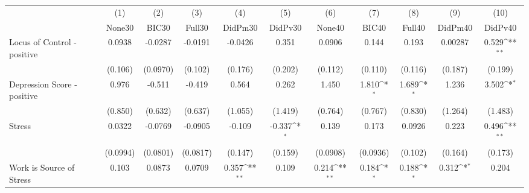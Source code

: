 {
\def\sym#1{\ifmmode^{#1}\else\(^{#1}\)\fi}
\begin{tabular}{l*{10}{c}}
\toprule
            &\multicolumn{1}{c}{(1)}&\multicolumn{1}{c}{(2)}&\multicolumn{1}{c}{(3)}&\multicolumn{1}{c}{(4)}&\multicolumn{1}{c}{(5)}&\multicolumn{1}{c}{(6)}&\multicolumn{1}{c}{(7)}&\multicolumn{1}{c}{(8)}&\multicolumn{1}{c}{(9)}&\multicolumn{1}{c}{(10)}\\
            &\multicolumn{1}{c}{None30}&\multicolumn{1}{c}{BIC30}&\multicolumn{1}{c}{Full30}&\multicolumn{1}{c}{DidPm30}&\multicolumn{1}{c}{DidPv30}&\multicolumn{1}{c}{None40}&\multicolumn{1}{c}{BIC40}&\multicolumn{1}{c}{Full40}&\multicolumn{1}{c}{DidPm40}&\multicolumn{1}{c}{DidPv40}\\
\midrule
Locus of Control - positive&      0.0938         &     -0.0287         &     -0.0191         &     -0.0426         &       0.351         &      0.0906         &       0.144         &       0.193         &     0.00287         &       0.529\sym{**} \\
            &     (0.106)         &    (0.0970)         &     (0.102)         &     (0.176)         &     (0.202)         &     (0.112)         &     (0.110)         &     (0.116)         &     (0.187)         &     (0.199)         \\
\addlinespace
Depression Score - positive&       0.976         &      -0.511         &      -0.419         &       0.564         &       0.262         &       1.450         &       1.810\sym{*}  &       1.689\sym{*}  &       1.236         &       3.502\sym{*}  \\
            &     (0.850)         &     (0.632)         &     (0.637)         &     (1.055)         &     (1.419)         &     (0.764)         &     (0.767)         &     (0.830)         &     (1.264)         &     (1.483)         \\
\addlinespace
Stress      &      0.0322         &     -0.0769         &     -0.0905         &      -0.109         &      -0.337\sym{*}  &       0.139         &       0.173         &      0.0926         &       0.223         &       0.496\sym{**} \\
            &    (0.0994)         &    (0.0801)         &    (0.0817)         &     (0.147)         &     (0.159)         &    (0.0908)         &    (0.0936)         &     (0.102)         &     (0.164)         &     (0.173)         \\
\addlinespace
Work is Source of Stress&       0.103         &      0.0873         &      0.0709         &       0.357\sym{**} &       0.109         &       0.214\sym{**} &       0.184\sym{*}  &       0.188\sym{*}  &       0.312\sym{*}  &       0.204         \\

\end{tabular}}
